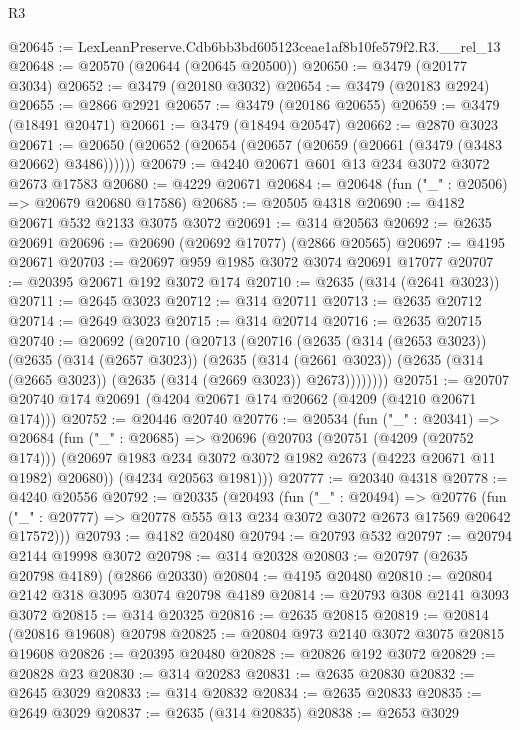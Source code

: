 \begin{lexlean}{R3}
\begin{coremodule}
@20645 := LexLeanPreserve.Cdb6bb3bd605123ceae1af8b10fe579f2.R3.__rel_13
@20648 := @20570 (@20644 (@20645 @20500))
@20650 := @3479 (@20177 @3034)
@20652 := @3479 (@20180 @3032)
@20654 := @3479 (@20183 @2924)
@20655 := @2866 @2921
@20657 := @3479 (@20186 @20655)
@20659 := @3479 (@18491 @20471)
@20661 := @3479 (@18494 @20547)
@20662 := @2870 @3023
@20671 := @20650 (@20652 (@20654 (@20657 (@20659 (@20661 (@3479 (@3483 @20662) @3486))))))
@20679 := @4240 @20671 @601 @13 @234 @3072 @3072 @2673 @17583
@20680 := @4229 @20671
@20684 := @20648 (fun ("_" : @20506) => @20679 @20680 @17586)
@20685 := @20505 @4318
@20690 := @4182 @20671 @532 @2133 @3075 @3072
@20691 := @314 @20563
@20692 := @2635 @20691
@20696 := @20690 (@20692 @17077) (@2866 @20565)
@20697 := @4195 @20671
@20703 := @20697 @959 @1985 @3072 @3074 @20691 @17077
@20707 := @20395 @20671 @192 @3072 @174
@20710 := @2635 (@314 (@2641 @3023))
@20711 := @2645 @3023
@20712 := @314 @20711
@20713 := @2635 @20712
@20714 := @2649 @3023
@20715 := @314 @20714
@20716 := @2635 @20715
@20740 := @20692
    (@20710
      (@20713
        (@20716
          (@2635
            (@314 (@2653 @3023))
            (@2635
              (@314 (@2657 @3023))
              (@2635
                (@314 (@2661 @3023))
                (@2635 (@314 (@2665 @3023)) (@2635 (@314 (@2669 @3023)) @2673))))))))
@20751 := @20707 @20740 @174 @20691 (@4204 @20671 @174 @20662 (@4209 (@4210 @20671 @174)))
@20752 := @20446 @20740
@20776 := @20534
    (fun ("_" : @20341) =>
    @20684
      (fun ("_" : @20685) =>
      @20696
        (@20703
          (@20751 (@4209 (@20752 @174)))
          (@20697 @1983 @234 @3072 @3072 @1982 @2673 (@4223 @20671 @11 @1982) @20680))
        (@4234 @20563 @1981)))
@20777 := @20340 @4318
@20778 := @4240 @20556
@20792 := @20335
    (@20493
      (fun ("_" : @20494) =>
      @20776 (fun ("_" : @20777) => @20778 @555 @13 @234 @3072 @3072 @2673 @17569 @20642 @17572)))
@20793 := @4182 @20480
@20794 := @20793 @532
@20797 := @20794 @2144 @19998 @3072
@20798 := @314 @20328
@20803 := @20797 (@2635 @20798 @4189) (@2866 @20330)
@20804 := @4195 @20480
@20810 := @20804 @2142 @318 @3095 @3074 @20798 @4189
@20814 := @20793 @308 @2141 @3093 @3072
@20815 := @314 @20325
@20816 := @2635 @20815
@20819 := @20814 (@20816 @19608) @20798
@20825 := @20804 @973 @2140 @3072 @3075 @20815 @19608
@20826 := @20395 @20480
@20828 := @20826 @192 @3072
@20829 := @20828 @23
@20830 := @314 @20283
@20831 := @2635 @20830
@20832 := @2645 @3029
@20833 := @314 @20832
@20834 := @2635 @20833
@20835 := @2649 @3029
@20837 := @2635 (@314 @20835)
@20838 := @2653 @3029

\end{coremodule}
\end{lexlean}
